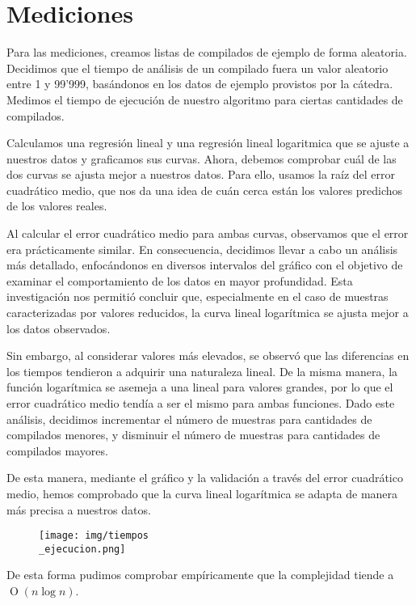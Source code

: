 \section{Mediciones}

Para las mediciones, creamos listas de compilados de ejemplo de forma aleatoria. Decidimos que el tiempo
de análisis de un compilado fuera un valor aleatorio entre 1 y 99'999, basándonos en los datos de ejemplo
provistos por la cátedra.
Medimos el tiempo de ejecución de nuestro algoritmo para ciertas cantidades de compilados.

Calculamos una regresión lineal y una regresión lineal logaritmica que se ajuste a nuestros datos y graficamos sus curvas.
Ahora, debemos comprobar cuál de las dos curvas se ajusta mejor a nuestros datos. Para ello, usamos la raíz del
error cuadrático medio, que nos da una idea de cuán cerca están los valores predichos de los valores reales.

Al calcular el error cuadrático medio para ambas curvas, observamos que el error era prácticamente similar.
En consecuencia, decidimos llevar a cabo un análisis más detallado,
enfocándonos en diversos intervalos del gráfico con el objetivo de examinar el comportamiento de los datos en mayor
profundidad. Esta investigación nos permitió concluir que, especialmente en el caso de muestras caracterizadas
por valores reducidos, la curva lineal logarítmica se ajusta mejor a los datos observados.

Sin embargo, al considerar valores más elevados, se observó que las diferencias en los tiempos tendieron a adquirir una naturaleza lineal. 
De la misma manera, la función logarítmica se asemeja a una lineal para valores grandes, por lo que el error cuadrático medio tendía a ser el mismo
para ambas funciones. Dado este análisis, decidimos incrementar el número de muestras para cantidades de compilados menores, 
y disminuir el número de muestras para cantidades de compilados mayores. 

De esta manera, mediante el gráfico y la validación a través del error cuadrático medio, hemos comprobado que la curva lineal logarítmica 
se adapta de manera más precisa a nuestros datos.

\begin{figure}[H]
    \centering
    \texttt{[image: img/tiempos\\\_ejecucion.png]}
\end{figure}


De esta forma pudimos comprobar empíricamente que la complejidad tiende a $\operatorname{O}(n\log{n})$.